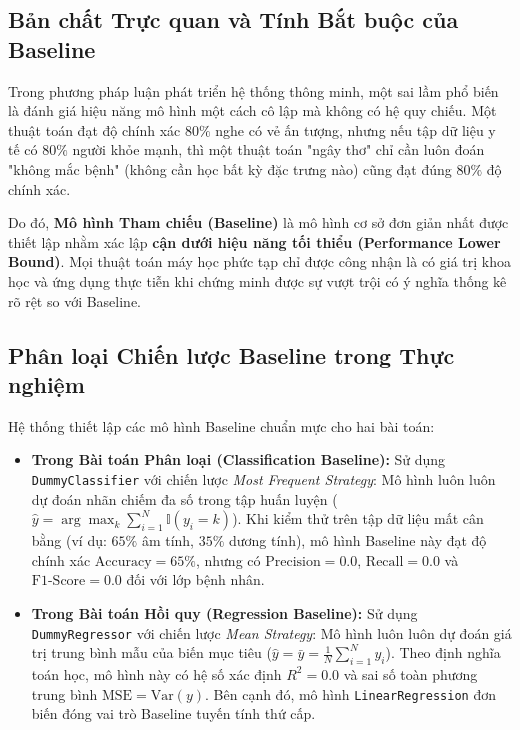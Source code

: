 \documentclass[12pt,a4paper]{report}
\begin{document}
\subsection{Bản chất Trực quan và Tính Bắt buộc của Baseline}
Trong phương pháp luận phát triển hệ thống thông minh, một sai lầm phổ biến là đánh giá hiệu năng mô hình một cách cô lập mà không có hệ quy chiếu. Một thuật toán đạt độ chính xác $80\%$ nghe có vẻ ấn tượng, nhưng nếu tập dữ liệu y tế có $80\%$ người khỏe mạnh, thì một thuật toán "ngây thơ" chỉ cần luôn đoán "không mắc bệnh" (không cần học bất kỳ đặc trưng nào) cũng đạt đúng $80\%$ độ chính xác.

Do đó, \textbf{Mô hình Tham chiếu (Baseline)} là mô hình cơ sở đơn giản nhất được thiết lập nhằm xác lập \textbf{cận dưới hiệu năng tối thiểu (Performance Lower Bound)}. Mọi thuật toán máy học phức tạp chỉ được công nhận là có giá trị khoa học và ứng dụng thực tiễn khi chứng minh được sự vượt trội có ý nghĩa thống kê rõ rệt so với Baseline.

\subsection{Phân loại Chiến lược Baseline trong Thực nghiệm}
Hệ thống thiết lập các mô hình Baseline chuẩn mực cho hai bài toán:
\begin{itemize}[leftmargin=1.5em]
    \item \textbf{Trong Bài toán Phân loại (Classification Baseline):}
    Sử dụng \texttt{DummyClassifier} với chiến lược \textit{Most Frequent Strategy}: Mô hình luôn luôn dự đoán nhãn chiếm đa số trong tập huấn luyện ($\hat{y} = \arg\max_k \sum_{i=1}^N \mathbb{I}(y_i = k)$). Khi kiểm thử trên tập dữ liệu mất cân bằng (ví dụ: $65\%$ âm tính, $35\%$ dương tính), mô hình Baseline này đạt độ chính xác $\text{Accuracy} = 65\%$, nhưng có $\text{Precision} = 0.0$, $\text{Recall} = 0.0$ và $\text{F1-Score} = 0.0$ đối với lớp bệnh nhân.
    
    \item \textbf{Trong Bài toán Hồi quy (Regression Baseline):}
    Sử dụng \texttt{DummyRegressor} với chiến lược \textit{Mean Strategy}: Mô hình luôn luôn dự đoán giá trị trung bình mẫu của biến mục tiêu ($\hat{y} = \bar{y} = \frac{1}{N}\sum_{i=1}^N y_i$). Theo định nghĩa toán học, mô hình này có hệ số xác định $R^2 = 0.0$ và sai số toàn phương trung bình $\text{MSE} = \text{Var}(y)$. Bên cạnh đó, mô hình \texttt{LinearRegression} đơn biến đóng vai trò Baseline tuyến tính thứ cấp.
\end{itemize}
\end{document}
